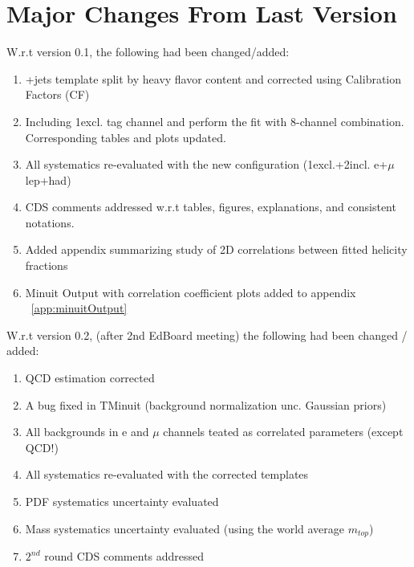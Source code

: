 \section*{Major Changes From Last Version}
\label{sec:changes}

W.r.t version 0.1, the following had been changed/added:

\begin{enumerate}

\item \w+jets template split by heavy flavor content and corrected using Calibration Factors (CF)
\item Including 1excl. \bt tag channel and perform the fit with 8-channel combination. Corresponding tables and plots updated.
\item All systematics re-evaluated with the new configuration (1excl.+2incl. e+$\mu$ lep+had)
\item CDS comments addressed w.r.t tables, figures, explanations, and consistent notations. 
\item Added appendix summarizing study of 2D correlations between fitted helicity fractions
\item Minuit Output with correlation coefficient plots added to appendix ~\ref{app:minuitOutput}
\end{enumerate}

W.r.t version 0.2, (after 2nd EdBoard meeting) the following had been changed / added:
\begin{enumerate}

\item QCD estimation corrected
\item A bug fixed in TMinuit (background normalization unc. Gaussian priors)
\item All backgrounds in e and $\mu$ channels teated as correlated parameters (except QCD!)
\item All systematics re-evaluated with the corrected templates
\item PDF systematics uncertainty evaluated
\item Mass systematics uncertainty evaluated (using the world average $m_{top}$)
\item $2^{nd}$ round CDS comments addressed
\end{enumerate}

